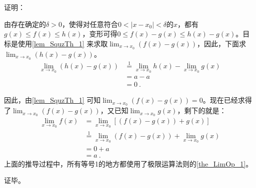 证明：

由存在确定的$\delta>0$，使得对任意符合$0<|x-x_0|<\delta$的$x$，都有$g(x)\leq f(x)\leq h(x)$，变形可得$0\leq f(x)-g(x)\leq h(x)-g(x)$。目标是使用\autoref{lem_SquzTh_1} 来求取$\lim _{x\to x_0}(f(x)-g(x))$，因此，下面求$\lim _{x\to x_0}(h(x)-g(x))$。
$$
\begin{align*}
\lim _{x\to x_0}(h(x)-g(x))&\overset{\mathrm{1}}{=}\lim _{x\to x_0}h(x)-\lim _{x\to x_0}g(x)\\
&=a-a\\
&=0~.
\end{align*}
$$

因此，由\autoref{lem_SquzTh_1} 可知$\lim _{x\to x_0}(f(x)-g(x))=0$。现在已经求得了$\lim _{x\to x_0}(f(x)-g(x))$，又已知$\lim _{x\to x_0}g(x)$，剩下的就是：
$$
\begin{align*}
\lim _{x\to x_0}f(x) &= \lim _{x\to x_0}[(f(x)-g(x))+g(x)] \\ 
&\overset{\mathrm{1}}{=} \lim _{x\to x_0}(f(x)-g(x))+\lim _{x\to x_0}g(x)\\ 
&= 0+a\\ 
&=a~.\end{align*}
$$
上面的推导过程中，所有等号1的地方都使用了极限运算法则的\autoref{the_LimOp_1}。

证毕。
